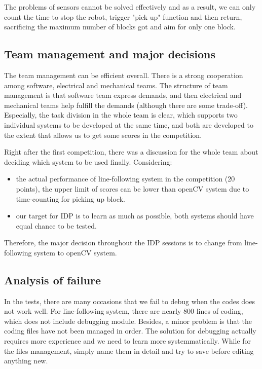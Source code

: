 \documentclass{article}
\begin{document}
The problems of sensors cannot be solved effectively and as a result, we can only count the time to stop the robot, trigger "pick up" function and then return, sacrificing the maximum number of blocks got and aim for only one block.

\subsection{Team management and major decisions}
The team management can be efficient overall. There is a strong cooperation among software, electrical and mechanical teams. The structure of team management is that software team express demands, and then electrical and mechanical teams help fulfill the demands (although there are some trade-off). Especially, the task division in the whole team is clear, which supports two individual systems to be developed at the same time, and both are developed to the extent that allows us to get some scores in the competition.

Right after the first competition, there was a discussion for the whole team about deciding which system to be used finally.
Considering:

\begin{itemize}
    \item the actual performance of line-following system in the competition (20 points), the upper limit of scores can be lower than openCV system due to time-counting for picking up block.
    \item our target for IDP is to learn as much as possible, both systems should have equal chance to be tested.
\end{itemize}
Therefore, the major decision throughout the IDP sessions is to change from line-following system to openCV system.

\subsection{Analysis of failure}
In the tests, there are many occasions that we fail to debug when the codes does not work well.
For line-following system, there are nearly 800 lines of coding, which does not include debugging module.
Besides, a minor problem is that the coding files have not been managed in order.
The solution for debugging actually requires more experience and we need to learn more systemmatically. While for the files management, simply name them in detail and try to save before editing anything new.
\end{document}
